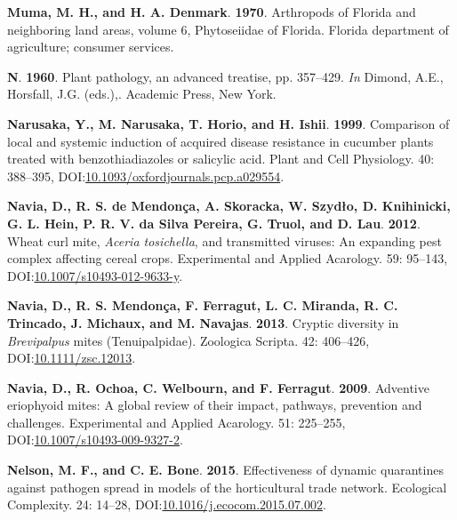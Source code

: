 \documentclass[12pt,final,CPage]{ufthesis}
\newlength{\cslhangindent}
\newenvironment{CSLReferences}[2] %
{%
	\setlength{\parindent}{0pt}
	\ifodd #1 \everypar{\setlength{\hangindent}{\cslhangindent}}\ignorespaces\fi
	\ifnum #2 > 0
	\setlength{\parskip}{#2\baselineskip}
	\fi
}%
{}
\begin{document}
{\begin{CSLReferences}{1}{0}
  \leavevmode{}%
  \textbf{Muma, M. H., and H. A. Denmark}. \textbf{1970}. Arthropods of {Florida} and neighboring land areas, volume 6, {Phytoseiidae} of {Florida}. Florida department of agriculture; consumer services.

  \leavevmode{}%
  \textbf{N}. \textbf{1960}. Plant pathology, an advanced treatise, pp. 357--429. \emph{In} Dimond, A.E., Horsfall, J.G. (eds.),. Academic Press, New York.

  \leavevmode{}%
  \textbf{Narusaka, Y., M. Narusaka, T. Horio, and H. Ishii}. \textbf{1999}. Comparison of local and systemic induction of acquired disease resistance in cucumber plants treated with benzothiadiazoles or salicylic acid. Plant and Cell Physiology. 40: 388--395, DOI:\href{https://doi.org/10.1093/oxfordjournals.pcp.a029554}{10.1093/oxfordjournals.pcp.a029554}.

  \leavevmode{}%
  \textbf{Navia, D., R. S. de Mendonça, A. Skoracka, W. Szydło, D. Knihinicki, G. L. Hein, P. R. V. da Silva Pereira, G. Truol, and D. Lau}. \textbf{2012}. {Wheat curl mite}, {\emph{Aceria tosichella}}, and transmitted viruses: An expanding pest complex affecting cereal crops. Experimental and Applied Acarology. 59: 95--143, DOI:\href{https://doi.org/10.1007/s10493-012-9633-y}{10.1007/s10493-012-9633-y}.

  \leavevmode{}%
  \textbf{Navia, D., R. S. Mendonça, F. Ferragut, L. C. Miranda, R. C. Trincado, J. Michaux, and M. Navajas}. \textbf{2013}. Cryptic diversity in {\emph{Brevipalpus}} mites ({Tenuipalpidae}). Zoologica Scripta. 42: 406--426, DOI:\href{https://doi.org/10.1111/zsc.12013}{10.1111/zsc.12013}.

  \leavevmode{}%
  \textbf{Navia, D., R. Ochoa, C. Welbourn, and F. Ferragut}. \textbf{2009}. Adventive eriophyoid mites: A global review of their impact, pathways, prevention and challenges. Experimental and Applied Acarology. 51: 225--255, DOI:\href{https://doi.org/10.1007/s10493-009-9327-2}{10.1007/s10493-009-9327-2}.

  \leavevmode{}%
  \textbf{Nelson, M. F., and C. E. Bone}. \textbf{2015}. Effectiveness of dynamic quarantines against pathogen spread in models of the horticultural trade network. Ecological Complexity. 24: 14--28, DOI:\href{https://doi.org/10.1016/j.ecocom.2015.07.002}{10.1016/j.ecocom.2015.07.002}.


\end{CSLReferences}}
\end{document}
